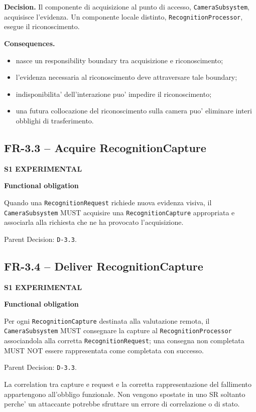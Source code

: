 \documentclass[11pt,a4paper]{article}
\newcommand{\experimental}{\textbf{S1 EXPERIMENTAL}}
\newenvironment{statusbox}[1]{%
  \def\FrameCommand{\fcolorbox{ddtablue}{ddtagray}}%
  \MakeFramed{\advance\hsize-2\width\FrameRestore}
  \noindent\textbf{#1}\par\smallskip
}{\endMakeFramed}
\begin{document}
\textbf{Decision.} Il componente di acquisizione al punto di accesso, \texttt{CameraSubsystem}, acquisisce l'evidenza. Un componente locale distinto, \texttt{RecognitionProcessor}, esegue il riconoscimento.

\textbf{Consequences.}
\begin{itemize}
  \item nasce un responsibility boundary tra acquisizione e riconoscimento;
  \item l'evidenza necessaria al riconoscimento deve attraversare tale boundary;
  \item indisponibilita' dell'interazione puo' impedire il riconoscimento;
  \item una futura collocazione del riconoscimento sulla camera puo' eliminare interi obblighi di trasferimento.
\end{itemize}

\subsection{FR-3.3 -- Acquire RecognitionCapture}

\experimental{}

\begin{statusbox}{Functional obligation}
Quando una \texttt{RecognitionRequest} richiede nuova evidenza visiva, il \texttt{CameraSubsystem} MUST acquisire una \texttt{RecognitionCapture} appropriata e associarla alla richiesta che ne ha provocato l'acquisizione.
\end{statusbox}

Parent Decision: \texttt{D-3.3}.

\subsection{FR-3.4 -- Deliver RecognitionCapture}

\experimental{}

\begin{statusbox}{Functional obligation}
Per ogni \texttt{RecognitionCapture} destinata alla valutazione remota, il \texttt{CameraSubsystem} MUST consegnare la capture al \texttt{RecognitionProcessor} associandola alla corretta \texttt{RecognitionRequest}; una consegna non completata MUST NOT essere rappresentata come completata con successo.
\end{statusbox}

Parent Decision: \texttt{D-3.3}.

La correlation tra capture e request e la corretta rappresentazione del fallimento appartengono all'obbligo funzionale. Non vengono spostate in uno SR soltanto perche' un attaccante potrebbe sfruttare un errore di correlazione o di stato.
\end{document}
